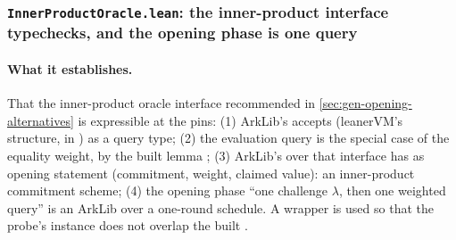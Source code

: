 \subsubsection{\texttt{InnerProductOracle.lean}: the inner-product interface typechecks, and the opening phase is one query}\label{sec:gen-opening-probe-inner}

\paragraph{What it establishes.} That the inner-product oracle interface recommended in
\cref{sec:gen-opening-alternatives} is expressible at the pins: (1) ArkLib's 
accepts  (leanerVM's structure, in ) as a query type; (2) the evaluation
query is the special case of the equality weight, by the built lemma ; (3)
ArkLib's  over that interface has as opening statement (commitment, weight,
claimed value): an inner-product commitment scheme; (4) the opening phase ``one challenge $λ$, then
one weighted query'' is an ArkLib  over a one-round schedule. A wrapper
 is used so that the probe's instance does not overlap the built .


